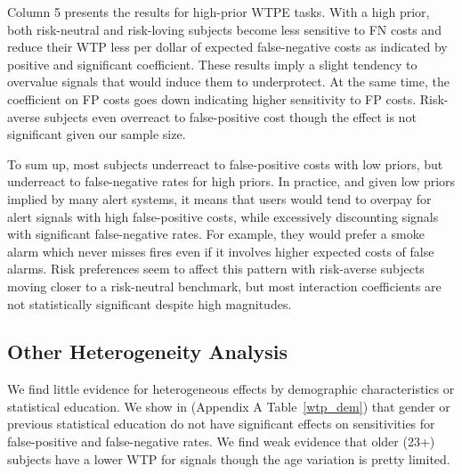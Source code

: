 \documentclass[12pt,a4paper]{article}
\newcommand{\agt}[1]{{\color{OliveGreen}#1}}
\newcommand{\aut}[1]{{\color{Red}#1}}
\begin{document}
Column 5 presents the results for high-prior WTPE tasks. With a high prior, both risk-neutral and risk-loving subjects become less sensitive to FN costs and reduce their WTP less per dollar of expected false-negative costs as indicated by positive and significant coefficient. These results imply a slight tendency to overvalue signals that would induce them to underprotect. At the same time, the coefficient on FP costs goes down indicating higher sensitivity to FP costs. Risk-averse subjects even overreact to false-positive cost though the effect is not significant given our sample size. 

To sum up, most subjects underreact to false-positive costs with low priors, but underreact to false-negative rates for high priors. In practice, and given low priors implied by many alert systems, it means that users would tend to overpay for alert signals with high false-positive costs, while excessively discounting signals with significant false-negative rates. For example, they would prefer a smoke alarm which never misses fires even if it involves higher expected costs of false alarms. Risk preferences seem to affect this pattern with risk-averse subjects moving closer to a risk-neutral benchmark, but most interaction coefficients are not statistically significant despite high magnitudes.





\subsection{Other Heterogeneity Analysis}

We find little evidence for heterogeneous effects by demographic characteristics or statistical education. We show in (Appendix A  Table~\ref{wtp_dem}) that gender or previous statistical education do not have significant effects on sensitivities for false-positive and false-negative rates. We find weak evidence that older (23+) subjects have a lower WTP for signals though the age variation is pretty limited. 
\end{document}
